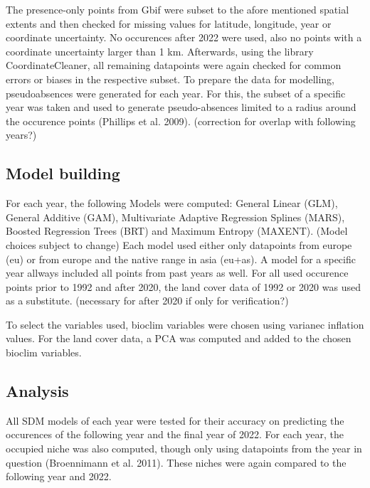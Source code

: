 \documentclass[11pt,a4paper]{article}
\begin{document}
The presence-only points from Gbif were subset to the afore mentioned spatial extents and then checked for missing values for latitude, longitude, year or coordinate uncertainty. 
No occurences after 2022 were used, also no points with a coordinate uncertainty larger than 1 km. 
Afterwards, using the library CoordinateCleaner, all remaining datapoints were again checked for common errors or biases in the respective subset.
To prepare the data for modelling, pseudoabsences were generated for each year. For this, the subset of a specific year was taken and used to generate pseudo-absences limited to a radius around the occurence points (Phillips et al. 2009). (correction for overlap with following years?)

\subsection{Model building}
For each year, the following Models were computed: General Linear (GLM), General Additive (GAM), Multivariate Adaptive Regression Splines (MARS), Boosted Regression Trees (BRT) and Maximum Entropy (MAXENT). 
(Model choices subject to change)
Each model used either only datapoints from europe (eu) or from europe and the native range in asia (eu+as). 
A model for a specific year allways included all points from past years as well.
For all used occurence points prior to 1992 and after 2020, the land cover data of 1992 or 2020 was used as a substitute.
(necessary for after 2020 if only for verification?)

To select the variables used, bioclim variables were chosen using varianec inflation values. 
For the land cover data, a PCA was computed and added to the chosen bioclim variables.

\subsection{Analysis}
All SDM models of each year were tested for their accuracy on predicting the occurences of the following year and the final year of 2022. 
For each year, the occupied niche was also computed, though only using datapoints from the year in question (Broennimann et al. 2011). 
These niches were again compared to the following year and 2022.
\end{document}
